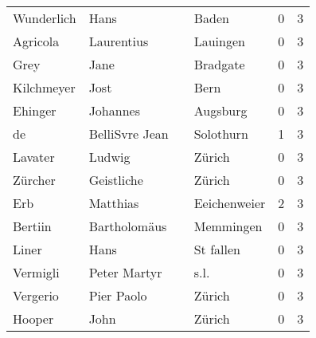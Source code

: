 \begin{center}
\begin{tiny}
\begin{longtabu}{llllrr}
               Wunderlich &                               Hans &             &                                       Baden &          0 &         3 \\
                 Agricola &                         Laurentius &             &                                    Lauingen &          0 &         3 \\
                     Grey &                               Jane &             &                                    Bradgate &          0 &         3 \\
               Kilchmeyer &                               Jost &             &                                        Bern &          0 &         3 \\
                  Ehinger &                           Johannes &             &                                    Augsburg &          0 &         3 \\
                       de &                     BelliSvre Jean &             &                                   Solothurn &          1 &         3 \\
                  Lavater &                             Ludwig &             &                                      Zürich &          0 &         3 \\
                  Zürcher &                         Geistliche &             &                                      Zürich &          0 &         3 \\
                      Erb &                           Matthias &             &                                Eeichenweier &          2 &         3 \\
                  Bertiin &                       Bartholomäus &             &                                   Memmingen &          0 &         3 \\
                    Liner &                               Hans &             &                                   St fallen &          0 &         3 \\
                 Vermigli &                       Peter Martyr &             &                                        s.l. &          0 &         3 \\
                 Vergerio &                         Pier Paolo &             &                                      Zürich &          0 &         3 \\
                   Hooper &                               John &             &                                      Zürich &          0 &         3 \\

\end{longtabu}
\end{tiny}
\end{center}
